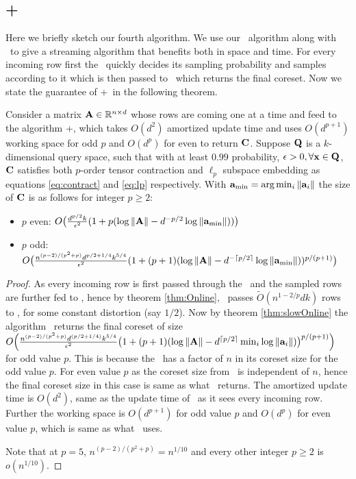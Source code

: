 \subsection{\online+}
Here we briefly sketch our fourth algorithm.
We use our \online~algorithm along with ~to give a streaming algorithm that benefits both in space and time. For every incoming row first the \online~quickly decides its sampling probability and samples according to it which is then passed to ~which returns the final coreset. Now we state the guarantee of \online+~in the following theorem.
\begin{theorem}{\label{thm:improvedOnlineCoreset}}
 Consider a matrix $\mathbf{A} \in \mathbb{R}^{n \times d}$ whose rows are coming one at a time and feed to the algorithm \online+, which takes $O(d^{2})$ amortized update time and uses $O(d^{p+1})$ working space for odd $p$ and $O(d^{p})$ for even to return $\mathbf{C}$. Suppose $\mathbf{Q}$ is a $k$-dimensional query space, such that with at least $0.99$ probability, $\epsilon > 0, \forall \mathbf{x} \in \mathbf{Q}$, $\mathbf{C}$ satisfies both $p$-order tensor contraction and $\ell_{p}$ subspace embedding as equations \eqref{eq:contract} and \eqref{eq:lp} respectively. With $\mathbf{a}_{\min} = \text{arg}\min_{i}\|\mathbf{a}_{i}\|$ the size of $\mathbf{C}$ is as follows for integer $p \geq 2$:
 \begin{itemize}
    \item $p$ even: $O\big(\frac{d^{p/2}k}{\epsilon^{2}}(1+p(\log \|\mathbf{A}\|-d^{-p/2} \log \|\mathbf{a}_{\min}\|))\big)$
    \item $p$ odd: $O\big(\frac{n^{(p-2)/(p^{2}+p)}d^{p/2+1/4}k^{5/4}}{\epsilon^{2}}(1+(p+1)(\log \|\mathbf{A}\|-d^{-\lceil p/2 \rceil}\log \|\mathbf{a}_{\min}\|))^{p/(p+1)}\big)$
 \end{itemize}
\end{theorem}
% 
\begin{proof}
 As every incoming row is first passed through the \online~and the sampled rows are further fed to , hence by theorem \ref{thm:Online}, \online~passes $\tilde{O}(n^{1-2/p}dk)$ rows to , for some constant distortion (say $1/2$). Now by theorem \ref{thm:slowOnline} the algorithm ~returns the final coreset of size $O\Big(\frac{n^{(p-2)/(p^2+p)}d^{(p/2+1/4)}k^{5/4}}{\epsilon^{2}}\big(1+(p+1)(\log \|\mathbf{A}\|-d^{\lceil p/2 \rceil}\min_{i}\log \|\mathbf{a}_{i}\|)\big)^{p/(p+1)}\Big)$ for odd value $p$. This is because the ~has a factor of $n$ in its coreset size for the odd value $p$. For even value $p$ as the coreset size from ~is independent of $n$, hence the final coreset size in this case is same as what ~returns. The amortized update time is $O(d^2)$, same as the update time of \online~as it sees every incoming row. Further the working space is $O(d^{p+1})$ for odd value $p$ and $O(d^{p})$ for even value $p$, which is same as what ~uses.
 
 Note that at $p=5$, $n^{(p-2)/(p^{2}+p)} = n^{1/10}$ and every other integer $p \geq 2$ is $o(n^{1/10})$.
\end{proof}
